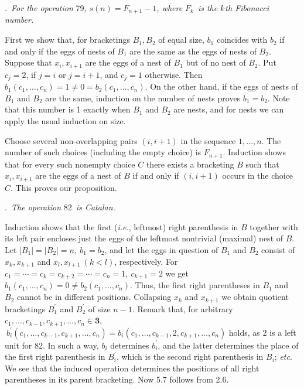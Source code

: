 \documentclass[a4paper,reqno]{amsart}\usepackage{amssymb,latexsym}
\theoremstyle{definition}
\theoremstyle{remark}
\numberwithin{equation}{section}
\numberwithin{theorem}{section}
\begin{document}
\bigskip

.\textit{\ For the operation }79\textit{, }$s(n)=F_{n+1}-1$\textit{, where }$F_{k}$\textit{\ is the }$k\hspace{1pt}$\textit{th
Fibonacci number.}

\smallskip

First we show that, for bracketings $B_{1},B_{2}$ of equal size, $b_{1}$
coincides with $b_{2}$ if and only if the eggs of nests of $B_{1}$ are the
same as the eggs of nests of $B_{2}$. Suppose that $x_{i},x_{i+1}$ are the
eggs of a nest of $B_{1}$ but of no nest of $B_{2}$. Put $c_{j}=2$, if $j=i$
or $j=i+1$, and $c_{j}=1$ otherwise. Then $b_{1}(c_{1},\ldots,c_{n})=1\neq0=b_{2}(c_{1},\ldots,c_{n})$. On the other hand, if the eggs of nests
of $B_{1}$ and $B_{2}$ are the same, induction on the number of nests proves
$b_{1}=b_{2}$. Note that this number is 1 exactly when $B_{1}$ and $B_{2}$ are
nests, and for nests we can apply the usual induction on size.

Choose several non-overlapping pairs $(i,i+1)$ in the sequence $1,\ldots,n$.
The number of such choices (including the empty choice) is $F_{n+1}$.
Induction shows that for every such nonempty choice $C$ there exists a
bracketing $B$ such that $x_{i},x_{i+1}$ are the eggs of a nest of $B$ if and
only if $(i,i+1)$ occurs in the choice $C$. This proves our proposition.

\bigskip

.\textit{\ The operation }82\textit{\ is Catalan.}

\smallskip

Induction shows that the first (\textit{i.e.}, leftmost) right parenthesis in
$B$ together with its left pair encloses just the eggs of the leftmost
nontrivial (maximal) nest of $B$. Let $|B_{1}|=|B_{2}|=n,~b_{1}=b_{2}$, and
let the eggs in question of $B_{1}$ and $B_{2}$ consist of $x_{k},x_{k+1}$ and
$x_{l},x_{l+1}~(k<l)$, respectively. For $c_{1}=\cdots=c_{k}=c_{k+2}=\cdots=c_{n}=1,~c_{k+1}=2$ we get $b_{1}(c_{1},\ldots,c_{n})=0\neq
b_{2}(c_{1},\ldots,c_{n})$. Thus, the first right parentheses in $B_{1}$ and
$B_{2}$ cannot be in different positions. Collapsing $x_{k}$ and $x_{k+1}$ we
obtain quotient bracketings $B_{1}^{\prime}$ and $B_{2}^{\prime}$ of size
$n-1$. Remark that, for arbitrary $c_{1},\ldots,c_{k-1},c_{k+1},\ldots
,c_{n}\in\mathbf{3}$,$~b_{i}^{\prime}(c_{1},\ldots,c_{k-1},c_{k+1},\ldots,c_{n})=b_{i}(c_{1},\ldots,c_{k-1},2,c_{k+1},\ldots,c_{n})$ holds, as
$2$ is a left unit for 82. In such a way, $b_{i}$ determines $b_{i}^{\prime}$,
and the latter determines the place of the first right parenthesis in
$B_{i}^{\prime}$, which is the second right parenthesis in $B_{i}$;
\textit{etc}. We see that the induced operation determines the positions of
all right parentheses in its parent bracketing. Now 5.7 follows from 2.6.
\end{document}
